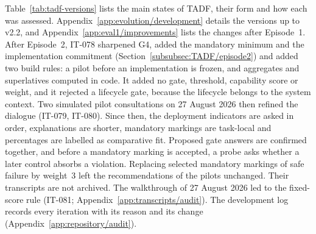 Table~\ref{tab:tadf-versions} lists the main states of TADF, their form and how each was assessed. Appendix~\ref{app:evolution/development} details the versions up to v2.2, and Appendix~\ref{app:eval1/improvements} lists the changes after Episode~1. After Episode~2, IT-078 sharpened G4, added the mandatory minimum and the implementation commitment (Section~\ref{subsubsec:TADF/episode2}) and added two build rules: a pilot before an implementation is frozen, and aggregates and superlatives computed in code. It added no gate, threshold, capability score or weight, and it rejected a lifecycle gate, because the lifecycle belongs to the system context. Two simulated pilot consultations on 27 August 2026 then refined the dialogue (IT-079, IT-080). Since then, the deployment indicators are asked in order, explanations are shorter, mandatory markings are task-local and percentages are labelled as comparative fit. Proposed gate answers are confirmed together, and before a mandatory marking is accepted, a probe asks whether a later control absorbs a violation. Replacing selected mandatory markings of safe failure by weight~3 left the recommendations of the pilots unchanged. Their transcripts are not archived. The walkthrough of 27 August 2026 led to the fixed-score rule (IT-081; Appendix~\ref{app:transcripts/audit}). The development log records every iteration with its reason and its change (Appendix~\ref{app:repository/audit}).

